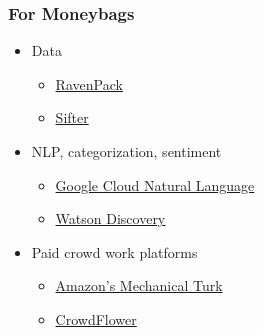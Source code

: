 \begin{frame}
\end{frame}

\begin{frame}
    \frametitle{For Moneybags}

    \begin{itemize}
        \item Data
    \begin{itemize}
        \item \textcolor{iseblue}{\href{https://www.ravenpack.com/}{RavenPack}}
        \item \textcolor{iseblue}{\href{https://sifter.texifter.com/}{Sifter}}
    \end{itemize}
    \end{itemize}
\vspace{10pt}
    \begin{itemize}
        \item NLP, categorization, sentiment
    \begin{itemize}
        \item \textcolor{iseblue}{\href{hhttps://cloud.google.com/natural-language/}{Google Cloud Natural Language}}
        \item \textcolor{iseblue}{\href{https://discovery-news-demo.mybluemix.net/?cm_mc_uid=56760058191115105959982&cm_mc_sid_50200000=1511105054&cm_mc_sid_52640000=1511105054}{Watson Discovery}}
    \end{itemize}
    \end{itemize}

\vspace{10pt}
    \begin{itemize}
        \item Paid crowd work platforms
    \begin{itemize}
        \item \textcolor{iseblue}{\href{https://requester.mturk.com/case_studies}{Amazon’s Mechanical Turk}}
        \item \textcolor{iseblue}{\href{https://www.crowdflower.com/}{CrowdFlower}}
    \end{itemize}
    \end{itemize}

\end{frame}